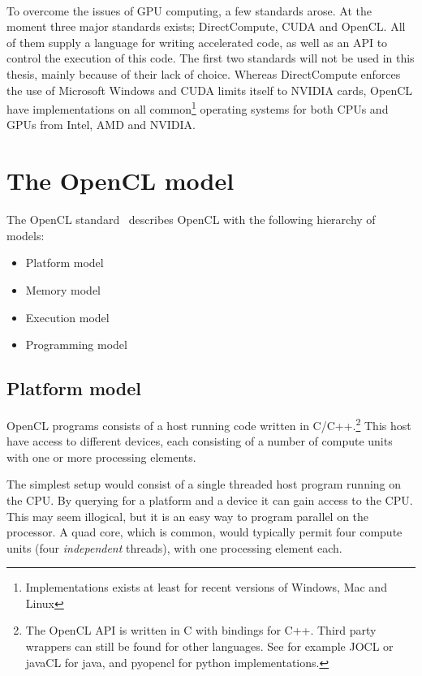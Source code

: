 \paragraph*{}
To overcome the issues of GPU computing, a few standards arose.
At the moment three major standards exists; DirectCompute, CUDA and OpenCL.
All of them supply a language for writing accelerated code, as well as an API to control the execution of this code.
The first two standards will not be used in this thesis, mainly because of their lack of choice.
Whereas DirectCompute enforces the use of Microsoft Windows and CUDA limits itself to NVIDIA cards, OpenCL have implementations on all common\footnote{Implementations exists at least for recent versions of Windows, Mac and Linux} operating systems for both CPUs and GPUs from Intel, AMD and NVIDIA.



\section{The OpenCL model}
The OpenCL standard~\cite{openclspec} describes OpenCL with the following hierarchy of models:
\begin{itemize}
\item Platform model
\item Memory model
\item Execution model
\item Programming model
\end{itemize}


\subsection{Platform model}
OpenCL programs consists of a host running code written in C/C++.\footnote{The OpenCL API is written in C with bindings for C++. Third party wrappers can still be found for other languages. See for example JOCL or javaCL for java, and pyopencl for python implementations.}
This host have access to different devices, each consisting of a number of compute units with one or more processing elements.

The simplest setup would consist of a single threaded host program running on the CPU. 
By querying for a platform and a device it can gain access to the CPU. 
This may seem illogical, but it is an easy way to program parallel on the processor.
A quad core, which is common, would typically permit four compute units (four \textit{independent} threads), with one processing element each.


